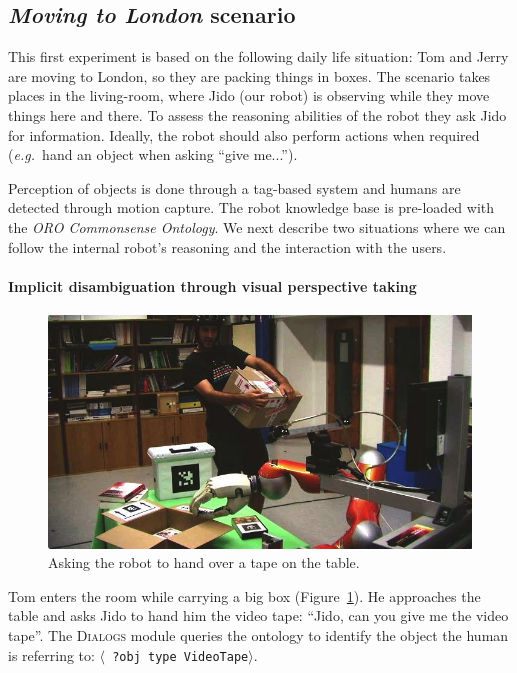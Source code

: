 \documentclass[preprint,3p,times]{elsarticle}
\newcommand{\stmt}[1]{{\footnotesize \tt $\langle$ #1\relax$\rangle$}}
\newcommand{\eg}{{\textit{e.g.\ }}}
\begin{document}
\subsection{\emph{Moving to London} scenario}

This first experiment is based on the following daily life situation: Tom and
Jerry are moving to London, so they are packing things in boxes. The scenario
takes places in the living-room, where Jido (our robot) is observing while they
move things here and there. To assess the reasoning abilities of the robot they
ask Jido for information. Ideally, the robot should
also perform actions when required (\eg hand an object when asking ``give
me...'').

Perception of objects is done through a tag-based system and humans are
detected through motion capture. The robot knowledge base is pre-loaded with
the \emph{ORO Commonsense Ontology}.  We next describe two
situations where we can follow the internal robot's reasoning and the
interaction with the users.

\paragraph{Implicit disambiguation through visual perspective taking}

\begin{figure}[!ht]
  \centering
  \includegraphics[width=0.9\linewidth]{pt.jpg}
\caption{Asking the robot to hand over a tape on the table.}
  \label{fig|vpt}
\end{figure}


Tom enters the room while carrying a big box (Figure~\ref{fig|vpt}). He
approaches the table and asks Jido to hand him the video tape: ``Jido, can
you give me the video tape''. The \textsc{Dialogs} module queries the ontology to
identify the object the human is referring to: \stmt{?obj type VideoTape}. 
\end{document}
